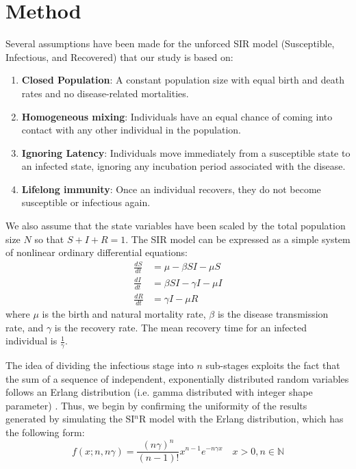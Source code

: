 \documentclass[12pt]{article}
\begin{document}
\section{Method}
Several assumptions have been made for the unforced SIR model (Susceptible, Infectious, and Recovered) that our study is based on: 
\begin{enumerate}
    \item \textbf{Closed Population}: A constant population size with equal birth and death rates and no disease-related mortalities.
    \item \textbf{Homogeneous mixing}: Individuals have an equal chance of coming into contact with any other individual in the population. 
    \item \textbf{Ignoring Latency}: Individuals move immediately from a susceptible state to an infected state, ignoring any incubation period associated with the disease.
    \item \textbf{Lifelong immunity}: Once an individual recovers, they do not become susceptible or infectious again.
\end{enumerate}
We also assume that the state variables have been scaled by the total population size $N$ so that $S + I + R = 1$. The SIR model can be expressed as a simple system of nonlinear ordinary differential equations:
\begin{align}
    \frac{dS}{dt} &= \mu - \beta SI - \mu S \\
    \frac{dI}{dt} &= \beta SI - \gamma I - \mu I \\
    \frac{dR}{dt} &= \gamma I - \mu R
\end{align}
where $\mu$ is the birth and natural mortality rate, $\beta$ is the disease transmission rate, and $\gamma$ is the recovery rate. The mean recovery time for an infected individual is $\frac{1}{\gamma}$. 

The idea of dividing the infectious stage into $n$ sub-stages exploits the fact that the sum of a sequence of independent, exponentially distributed random variables follows an Erlang distribution (i.e. gamma distributed with integer shape parameter) \cite{therrien2018probability}. Thus, we begin by confirming the uniformity of the results generated by simulating the SI$^n$R model with the Erlang distribution, which has the following form:
\begin{equation*}
    f(x; n,n\gamma) = \frac{(n\gamma)^n}{(n-1)!} x^{n-1} e^{-n\gamma x} \quad x>0, n \in \mathbb{N}
\end{equation*}
\end{document}
